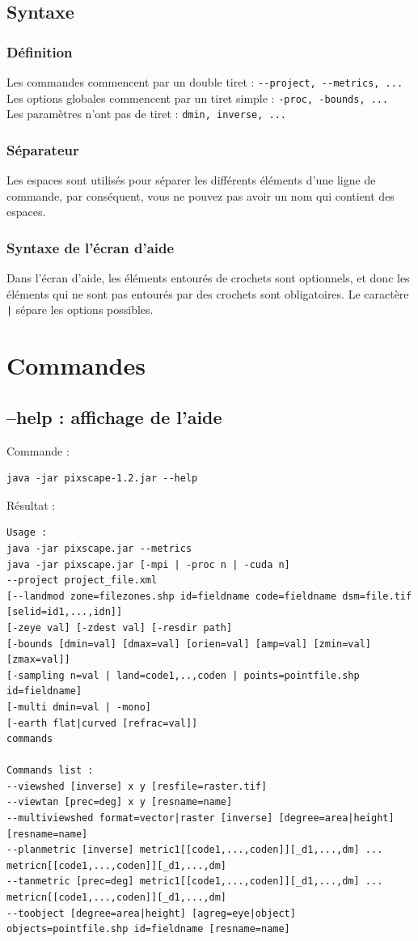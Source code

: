 \documentclass{report}
\begin{document}
\subsection{Syntaxe}
\subsubsection{Définition}
Les commandes commencent par un double tiret : \verb|--project, --metrics, ...|\\
Les options globales commencent par un tiret simple : \verb|-proc, -bounds, ...|\\
Les paramètres n'ont pas de tiret : \verb|dmin, inverse, ...|

\subsubsection{Séparateur}
Les espaces sont utilisés pour séparer les différents éléments d'une ligne de commande, par conséquent, vous ne pouvez pas avoir un nom qui contient des espaces.\\

\subsubsection{Syntaxe de l'écran d'aide}
Dans l'écran d'aide, les éléments entourés de crochets sont optionnels, et donc les éléments qui ne sont pas entourés par des crochets sont obligatoires. Le caractère \verb+|+ sépare les options possibles.

\section{Commandes}

\subsection{--help : affichage de l'aide}
Commande :
\begin{Verbatim}
java -jar pixscape-1.2.jar --help
\end{Verbatim}
Résultat :
\begin{Verbatim}
Usage :
java -jar pixscape.jar --metrics
java -jar pixscape.jar [-mpi | -proc n | -cuda n]
--project project_file.xml
[--landmod zone=filezones.shp id=fieldname code=fieldname dsm=file.tif [selid=id1,...,idn]]
[-zeye val] [-zdest val] [-resdir path]
[-bounds [dmin=val] [dmax=val] [orien=val] [amp=val] [zmin=val] [zmax=val]]
[-sampling n=val | land=code1,..,coden | points=pointfile.shp id=fieldname]
[-multi dmin=val | -mono]
[-earth flat|curved [refrac=val]]
commands

Commands list :
--viewshed [inverse] x y [resfile=raster.tif]
--viewtan [prec=deg] x y [resname=name]
--multiviewshed format=vector|raster [inverse] [degree=area|height] [resname=name]
--planmetric [inverse] metric1[[code1,...,coden]][_d1,...,dm] ... metricn[[code1,...,coden]][_d1,...,dm]
--tanmetric [prec=deg] metric1[[code1,...,coden]][_d1,...,dm] ... metricn[[code1,...,coden]][_d1,...,dm]
--toobject [degree=area|height] [agreg=eye|object] objects=pointfile.shp id=fieldname [resname=name]
\end{Verbatim}
\end{document}
